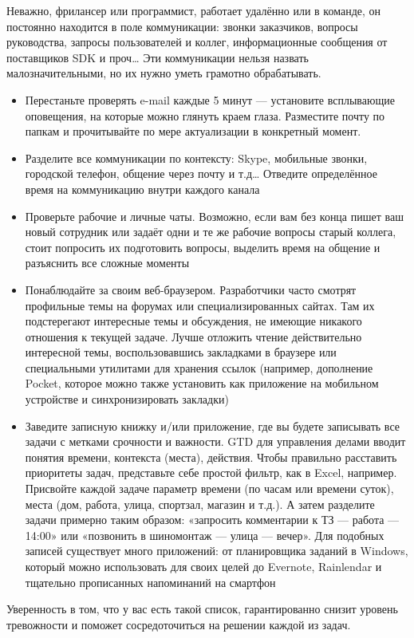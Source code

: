 \documentclass{../industrial-development}
\begin{document}
Неважно, фрилансер или программист, работает удалённо или в команде, он постоянно находится в поле коммуникации: звонки заказчиков, вопросы руководства, запросы пользователей и коллег, информационные сообщения от поставщиков SDK и проч… Эти коммуникации нельзя назвать малозначительными, но их нужно уметь грамотно обрабатывать.
  \begin{itemize}
  \item Перестаньте проверять e-mail каждые 5 минут — установите всплывающие оповещения, на которые можно глянуть краем глаза. Разместите почту по папкам и прочитывайте по мере актуализации в конкретный момент.
  \item Разделите все коммуникации по контексту: Skype, мобильные звонки, городской телефон, общение через почту и т.д… Отведите определённое время на коммуникацию внутри каждого канала
  \item Проверьте рабочие и личные чаты. Возможно, если вам без конца пишет ваш новый сотрудник или задаёт одни и те же рабочие вопросы старый коллега, стоит попросить их подготовить вопросы, выделить время на общение и разъяснить все сложные моменты
  \item Понаблюдайте за своим веб-браузером. Разработчики часто смотрят профильные темы на форумах или специализированных сайтах. Там их подстерегают интересные темы и обсуждения, не имеющие никакого отношения к текущей задаче. Лучше отложить чтение действительно интересной темы, воспользовавшись закладками в браузере или специальными утилитами для хранения ссылок (например, дополнение Pocket, которое можно также установить как приложение на мобильном устройстве и синхронизировать закладки)
  \item Заведите записную книжку и/или приложение, где вы будете записывать все задачи с метками срочности и важности. GTD для управления делами вводит понятия времени, контекста (места), действия. Чтобы правильно расставить приоритеты задач, представьте себе простой фильтр, как в Excel, например. Присвойте каждой задаче параметр времени (по часам или времени суток), места (дом, работа, улица, спортзал, магазин и т.д.). А затем разделите задачи примерно таким образом: «запросить комментарии к ТЗ — работа — 14:00» или «позвонить в шиномонтаж — улица — вечер». Для подобных записей существует много приложений: от планировщика заданий в Windows, который можно использовать для своих целей до Evernote, Rainlendar и тщательно прописанных напоминаний на смартфон
  \end{itemize}
Уверенность в том, что у вас есть такой список, гарантированно снизит уровень тревожности и поможет сосредоточиться на решении каждой из задач.
\end{document}
